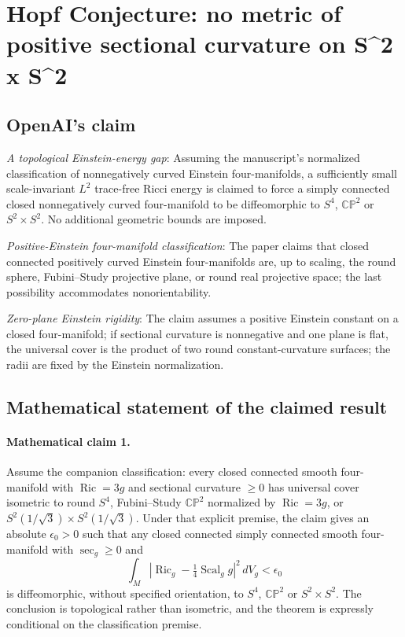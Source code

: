 \documentclass[11pt]{article}
\begin{document}
\section*{Hopf Conjecture: no metric of positive sectional curvature on S\textasciicircum{}2 x S\textasciicircum{}2}

\subsection{OpenAI's claim}
\textit{A topological Einstein-energy gap}: Assuming the manuscript's normalized classification of nonnegatively curved Einstein four-manifolds, a sufficiently small scale-invariant $L^2$ trace-free Ricci energy is claimed to force a simply connected closed nonnegatively curved four-manifold to be diffeomorphic to $S^4$, $\mathbb{CP}^2$ or $S^2\times S^2$. No additional geometric bounds are imposed.

\textit{Positive-Einstein four-manifold classification}: The paper claims that closed connected positively curved Einstein four-manifolds are, up to scaling, the round sphere, Fubini--Study projective plane, or round real projective space; the last possibility accommodates nonorientability.

\textit{Zero-plane Einstein rigidity}: The claim assumes a positive Einstein constant on a closed four-manifold; if sectional curvature is nonnegative and one plane is flat, the universal cover is the product of two round constant-curvature surfaces; the radii are fixed by the Einstein normalization.

\subsection{Mathematical statement of the claimed result}
\paragraph{Mathematical claim 1.} Assume the companion classification: every closed connected smooth four-manifold with $\operatorname{Ric}=3g$ and sectional curvature $\ge0$ has universal cover isometric to round $S^4$, Fubini--Study $\mathbb{CP}^2$ normalized by $\operatorname{Ric}=3g$, or $S^2(1/\sqrt3)\times S^2(1/\sqrt3)$. Under that explicit premise, the claim gives an absolute $\epsilon_0>0$ such that any closed connected simply connected smooth four-manifold with $\sec_g\ge0$ and \[\int_M\left|\operatorname{Ric}_g-\tfrac14\operatorname{Scal}_g g\right|^2\,dV_g<\epsilon_0\] is diffeomorphic, without specified orientation, to $S^4$, $\mathbb{CP}^2$ or $S^2\times S^2$. The conclusion is topological rather than isometric, and the theorem is expressly conditional on the classification premise.
\end{document}
